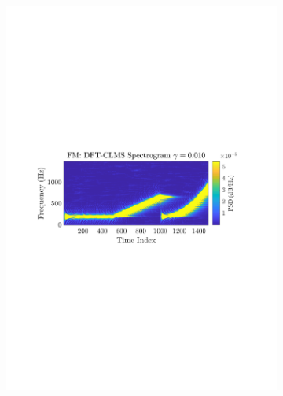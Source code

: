 \documentclass[12pt]{article}
\numberwithin{equation}{section}
\begin{document}
			\begin{figure}[H]
				\centering
				\begin{subfigure}{0.49\textwidth}
					\centering
					\includegraphics[trim={2.2cm 11.2cm 3.00cm  11.2cm}, clip, width=\textwidth]{../MATLAB/figures/q3_3c_fig02.pdf} 
					\captionsetup{justification=centering}
				\end{subfigure}
				\begin{subfigure}{0.49\textwidth}
					\centering

\end{subfigure}
\end{figure}
\end{document}
